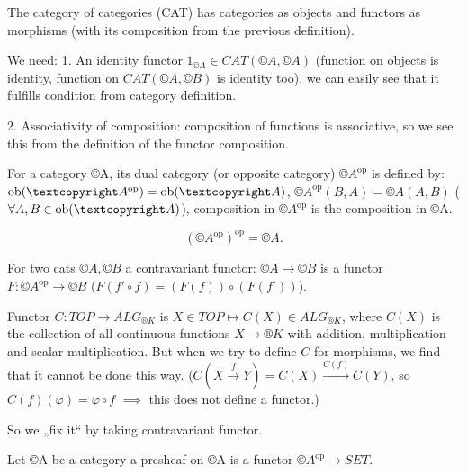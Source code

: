 \documentclass[12pt]{article}					%
\newcommand{\op}{^{\text{op}}}
\begin{document}
\begin{definice}[CAT]
	The category of categories (CAT) has categories as objects and functors as morphisms (with its composition from the previous definition).

	\begin{dukazin}
		We need: 1. An identity functor $1_{©A} \in CAT(©A, ©A)$ (function on objects is identity, function on $CAT(©A, ©B)$ is identity too), we can easily see that it fulfills condition from category definition.

		2. Associativity of composition: composition of functions is associative, so we see this from the definition of the functor composition.
	\end{dukazin}
\end{definice}

\begin{definice}
	For a category ©A, its dual category (or opposite category) $©A\op$ is defined by: $\ob(©A\op) = \ob(©A)$, $©A\op(B, A) = ©A(A, B)$ ($\forall A, B \in \ob(©A)$), composition in $©A\op$ is the composition in ©A.
\end{definice}

\begin{priklad}[Excercise]
	$$ (©A\op)\op = ©A. $$
\end{priklad}

\begin{definice}
	For two cats $©A, ©B$ a contravariant functor: $©A \rightarrow ©B$ is a functor $F: ©A\op \rightarrow ©B$ ($F(f' ∘ f) = (F(f)) ∘ (F(f'))$).
\end{definice}

\begin{priklad}
	Functor $C: TOP \rightarrow ALG_{®K}$ is $X \in TOP \mapsto C(X) \in ALG_{®K}$, where $C(X)$ is the collection of all continuous functions $X \rightarrow ®K$ with addition, multiplication and scalar multiplication. But when we try to define $C$ for morphisms, we find that it cannot be done this way. ($C(X \overset{f}\rightarrow Y) = C(X) \overset{C(f)}\rightarrow C(Y)$, so $C(f)(φ) = φ ∘ f$ $\implies$ this does not define a functor.)

	So we „fix it“ by taking contravariant functor.
\end{priklad}

\begin{definice}[Presheaf]
	Let ©A be a category a presheaf on ©A is a functor $©A\op \rightarrow SET$.
\end{definice}
\end{document}

